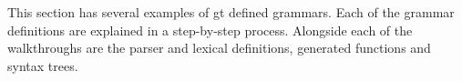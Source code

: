 This section has several examples of gt defined grammars. Each of the grammar definitions 
are explained in a step-by-step process. Alongside each of the walkthroughs are the parser
and lexical definitions, generated functions and syntax trees.




